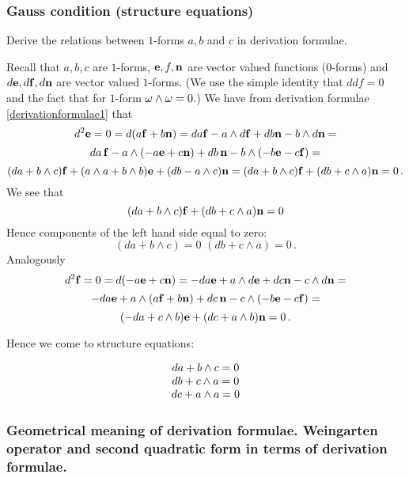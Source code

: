 \documentclass[12pt]{article}
\theoremstyle{theorem}
\numberwithin{equation}{section}
\begin{document}
{ \subsubsection  {Gauss condition (structure equations)}
    Derive the relations between $1$-forms $a,b$ and $c$ in derivation formulae.

    Recall that $a,b,c$ are $1$-forms, ${\bf e},f,{\bf n}$ are vector valued functions ($0$-forms)
    and  $d{\bf e},d{\bf f},d{\bf n}$ are vector valued $1$-forms.
    (We use the simple identity that $ddf=0$ and the fact that for $1$-form $\omega\wedge \omega=0$.)
     We have from derivation formulae \eqref{derivationformulae1} that
         $$
     d^2{\bf e}=0= d(a{\bf f}+b{\bf n})=da{\bf f}-a\wedge d{\bf f}+db{\bf n}-b\wedge d{\bf n}=
        $$
        $$
        da\, {\bf f}-a\wedge (-a {\bf e}+c{\bf n})+db\,{\bf n}-b\wedge(-b{\bf e}-c{\bf f})=
                       $$
                       $$
          (da+b\wedge c){\bf f}+(a\wedge a+b\wedge b){\bf e}+(db-a\wedge c){\bf n}=
          (da+b\wedge c){\bf f}+(db+c\wedge a){\bf n}=0\,.
                      $$
We see that
                \begin{equation}\label{gausscondition1}
                    (da+b\wedge c){\bf f}+(db+c\wedge a){\bf n}=0
                \end{equation}
                Hence components of the left hand side equal to zero:
\begin{equation}\label{gausscondition2}
                    (da+b\wedge c)=0\,\,(db+c\wedge a)=0\,.
                \end{equation}
Analogously
              $$
                       d^2{\bf f}=0= d(-a{\bf e}+c{\bf n})=-da{\bf e}+a\wedge d{\bf e}+dc{\bf n}-c\wedge d{\bf n}=
        $$
        $$
        -da{\bf e}+a\wedge (a {\bf f}+b{\bf n})+dc\,{\bf n}-c\wedge(-b{\bf e}-c{\bf f})=
                       $$
                       $$
          (-da+c\wedge b){\bf e}+(dc+a\wedge b){\bf n}=0\,.
              $$


 Hence we come to structure equations:

               \begin{equation}\label{firststructureformula}
               \begin{matrix}
                da+b\wedge c=0\cr
                 db+c\wedge a=0\cr
                 dc+a\wedge a=0\cr
                 \end{matrix}
               \end{equation}


          \subsubsection {Geometrical meaning of derivation formulae.
         Weingarten operator and second quadratic form in terms of derivation formulae. }




}
\end{document}
